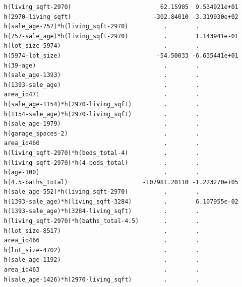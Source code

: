 \documentclass[
]{article}
\begin{document}
\begin{verbatim}
h(living_sqft-2970)                         62.15905  9.534921e+01
h(2970-living_sqft)                       -302.84010 -3.319930e+02
h(sale_age-757)*h(living_sqft-2970)          .        .           
h(757-sale_age)*h(living_sqft-2970)          .        1.143941e-01
h(lot_size-5974)                             .        .           
h(5974-lot_size)                           -54.50033 -6.635441e+01
h(39-age)                                    .        .           
h(sale_age-1393)                             .        .           
h(1393-sale_age)                             .        .           
area_id471                                   .        .           
h(sale_age-1154)*h(2970-living_sqft)         .        .           
h(1154-sale_age)*h(2970-living_sqft)         .        .           
h(sale_age-1979)                             .        .           
h(garage_spaces-2)                           .        .           
area_id460                                   .        .           
h(living_sqft-2970)*h(beds_total-4)          .        .           
h(living_sqft-2970)*h(4-beds_total)          .        .           
h(age-100)                                   .        .           
h(4.5-baths_total)                     -107981.20110 -1.223270e+05
h(sale_age-552)*h(living_sqft-2970)          .        .           
h(1393-sale_age)*h(living_sqft-3284)         .        6.107955e-02
h(1393-sale_age)*h(3284-living_sqft)         .        .           
h(living_sqft-2970)*h(baths_total-4.5)       .        .           
h(lot_size-8517)                             .        .           
area_id466                                   .        .           
h(lot_size-4702)                             .        .           
h(sale_age-1192)                             .        .           
area_id463                                   .        .           
h(sale_age-1426)*h(2970-living_sqft)         .        .           
                                                                  

\end{verbatim}
\end{document}
